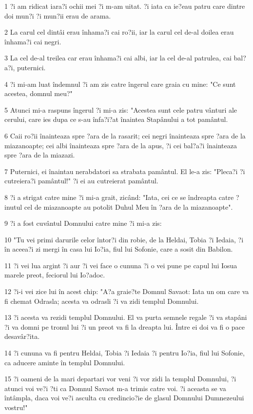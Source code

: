 \par 1 ?i am ridicat iara?i ochii mei ?i m-am uitat. ?i iata ca ie?eau patru care dintre doi mun?i ?i mun?ii erau de arama.
\par 2 La carul cel dintâi erau înhama?i cai ro?ii, iar la carul cel de-al doilea erau înhama?i cai negri.
\par 3 La cel de-al treilea car erau înhama?i cai albi, iar la cel de-al patrulea, cai bal?a?i, puternici.
\par 4 ?i mi-am luat îndemnul ?i am zis catre îngerul care graia cu mine: "Ce sunt acestea, domnul meu?"
\par 5 Atunci mi-a raspuns îngerul ?i mi-a zis: "Acestea sunt cele patru vânturi ale cerului, care ies dupa ce s-au înfa?i?at înaintea Stapânului a tot pamântul.
\par 6 Caii ro?ii înainteaza spre ?ara de la rasarit; cei negri înainteaza spre ?ara de la miazanoapte; cei albi înainteaza spre ?ara de la apus, ?i cei bal?a?i înainteaza spre ?ara de la miazazi.
\par 7 Puternici, ei înaintau nerabdatori sa strabata pamântul. El le-a zis: "Pleca?i ?i cutreiera?i pamântul!" ?i ei au cutreierat pamântul.
\par 8 ?i a strigat catre mine ?i mi-a grait, zicând: "Iata, cei ce se îndreapta catre ?inutul cel de miazanoapte au potolit Duhul Meu în ?ara de la miazanoapte".
\par 9 ?i a fost cuvântul Domnului catre mine ?i mi-a zis:
\par 10 "Tu vei primi darurile celor întor?i din robie, de la Heldai, Tobia ?i Iedaia, ?i în aceea?i zi mergi în casa lui Io?ia, fiul lui Sofonie, care a sosit din Babilon.
\par 11 ?i vei lua argint ?i aur ?i vei face o cununa ?i o vei pune pe capul lui Iosua marele preot, feciorul lui Io?adoc.
\par 12 ?i-i vei zice lui în acest chip: "A?a graie?te Domnul Savaot: Iata un om care va fi chemat Odrasla; acesta va odrasli ?i va zidi templul Domnului.
\par 13 ?i acesta va rezidi templul Domnului. El va purta semnele regale ?i va stapâni ?i va domni pe tronul lui ?i un preot va fi la dreapta lui. Între ei doi va fi o pace desavâr?ita.
\par 14 ?i cununa va fi pentru Heldai, Tobia ?i Iedaia ?i pentru Io?ia, fiul lui Sofonie, ca aducere aminte în templul Domnului.
\par 15 ?i oameni de la mari departari vor veni ?i vor zidi la templul Domnului, ?i atunci voi ve?i ?ti ca Domnul Savaot m-a trimis catre voi. ?i aceasta se va întâmpla, daca voi ve?i asculta cu credincio?ie de glasul Domnului Dumnezeului vostru!"

